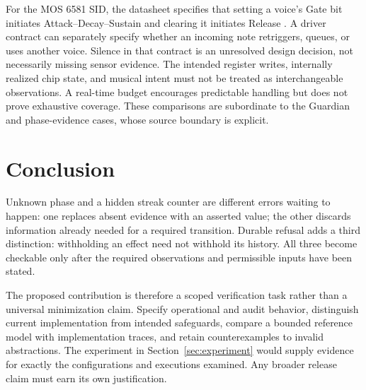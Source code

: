 \documentclass[11pt]{article}
\begin{document}
For the MOS 6581 SID, the datasheet specifies that setting a voice's Gate bit initiates Attack--Decay--Sustain and clearing it initiates Release \cite{sid}. A driver contract can separately specify whether an incoming note retriggers, queues, or uses another voice. Silence in that contract is an unresolved design decision, not necessarily missing sensor evidence. The intended register writes, internally realized chip state, and musical intent must not be treated as interchangeable observations. A real-time budget encourages predictable handling but does not prove exhaustive coverage. These comparisons are subordinate to the Guardian and phase-evidence cases, whose source boundary is explicit.

\section{Conclusion}
Unknown phase and a hidden streak counter are different errors waiting to happen: one replaces absent evidence with an asserted value; the other discards information already needed for a required transition. Durable refusal adds a third distinction: withholding an effect need not withhold its history. All three become checkable only after the required observations and permissible inputs have been stated.

The proposed contribution is therefore a scoped verification task rather than a universal minimization claim. Specify operational and audit behavior, distinguish current implementation from intended safeguards, compare a bounded reference model with implementation traces, and retain counterexamples to invalid abstractions. The experiment in Section~\ref{sec:experiment} would supply evidence for exactly the configurations and executions examined. Any broader release claim must earn its own justification.
\end{document}
